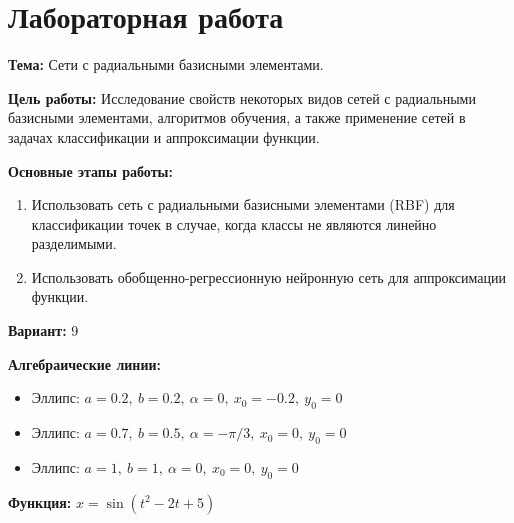 \section*{Лабораторная работа }

{\bfseries Тема:} Сети с радиальными базисными элементами.

{\bfseries Цель работы:} Исследование свойств некоторых видов сетей с радиальными базисными элементами, алгоритмов обучения, а также применение сетей в задачах классификации и аппроксимации функции.

{\bfseries Основные этапы работы:}
\begin{enumerate}
	\item Использовать сеть с радиальными базисными элементами (RBF) для классификации точек в случае, когда классы не являются линейно разделимыми.
	\item Использовать обобщенно-регрессионную нейронную сеть для аппроксимации функции.
\end{enumerate}

{\bfseries Вариант:} 9

{\bfseries Алгебраические линии:}
\begin{itemize}
	\item Эллипс: $a = 0.2,\ b = 0.2,\ \alpha = 0,\ x_0 = -0.2,\ y_0 = 0$
	\item Эллипс: $a = 0.7,\ b = 0.5,\ \alpha = -\pi/3,\ x_0 = 0,\ y_0 = 0$
	\item Эллипс: $a = 1,\ b = 1,\ \alpha = 0,\ x_0 = 0,\ y_0 = 0$
\end{itemize}

{\bfseries Функция:} $x = \sin(t ^ 2 - 2t + 5)$

\pagebreak
